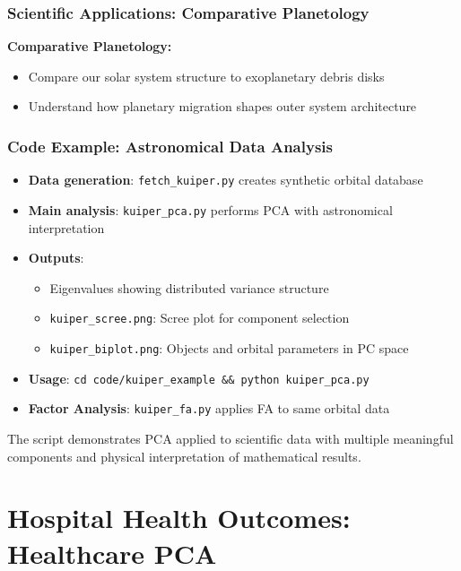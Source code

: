 \documentclass[aspectratio=169]{beamer}
\begin{document}
\begin{frame}
    \frametitle{Scientific Applications: Comparative Planetology}
    \textbf{Comparative Planetology:}
    \begin{itemize}
        \item Compare our solar system structure to exoplanetary debris disks \pause
        \item Understand how planetary migration shapes outer system architecture \pause
    \end{itemize}
\end{frame}

\begin{frame}
    \frametitle{Code Example: Astronomical Data Analysis}
    \begin{itemize}
        \item \textbf{Data generation}: \texttt{fetch\_kuiper.py} creates synthetic orbital database \pause
        \item \textbf{Main analysis}: \texttt{kuiper\_pca.py} performs PCA with astronomical interpretation \pause
        \item \textbf{Outputs}:
              \begin{itemize}
                  \item Eigenvalues showing distributed variance structure \pause
                  \item \texttt{kuiper\_scree.png}: Scree plot for component selection \pause
                  \item \texttt{kuiper\_biplot.png}: Objects and orbital parameters in PC space \pause
              \end{itemize}
        \item \textbf{Usage}: \texttt{cd code/kuiper\_example \&\& python kuiper\_pca.py} \pause
        \item \textbf{Factor Analysis}: \texttt{kuiper\_fa.py} applies FA to same orbital data \pause
    \end{itemize}
    \vspace{6pt}
    The script demonstrates PCA applied to scientific data with multiple meaningful components and physical interpretation of mathematical results.
\end{frame}

\section{Hospital Health Outcomes: Healthcare PCA}
\end{document}
